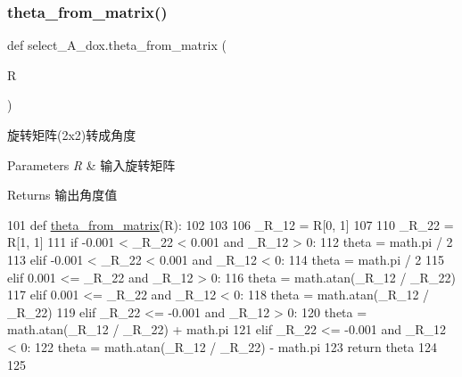 \subsubsection{\texorpdfstring{theta\+\_\+from\+\_\+matrix()}{theta\_from\_matrix()}}
{\footnotesize\ttfamily def select\+\_\+\+A\+\_\+dox.\+theta\+\_\+from\+\_\+matrix (\begin{DoxyParamCaption}\item[{}]{R }\end{DoxyParamCaption})}



旋转矩阵(2x2)转成角度 


\begin{DoxyParams}{Parameters}
{\em R} & 输入旋转矩阵\\
\hline
\end{DoxyParams}
\begin{DoxyReturn}{Returns}
输出角度值 
\end{DoxyReturn}

\begin{DoxyCode}
101 \textcolor{keyword}{def }\hyperlink{namespaceselect___a__dox_a7b416b405b394ffdf3fb7ca9d91bd896}{theta\_from\_matrix}(R):
102 
103     
106     \_R\_12 = R[0, 1]
107     
110     \_R\_22 = R[1, 1]
111     \textcolor{keywordflow}{if} -0.001 < \_R\_22 < 0.001 \textcolor{keywordflow}{and} \_R\_12 > 0:
112         theta = math.pi / 2
113     \textcolor{keywordflow}{elif} -0.001 < \_R\_22 < 0.001 \textcolor{keywordflow}{and} \_R\_12 < 0:
114         theta = math.pi / 2
115     \textcolor{keywordflow}{elif} 0.001 <= \_R\_22 \textcolor{keywordflow}{and} \_R\_12 > 0:
116         theta = math.atan(\_R\_12 / \_R\_22)
117     \textcolor{keywordflow}{elif} 0.001 <= \_R\_22 \textcolor{keywordflow}{and} \_R\_12 < 0:
118         theta = math.atan(\_R\_12 / \_R\_22)
119     \textcolor{keywordflow}{elif} \_R\_22 <= -0.001 \textcolor{keywordflow}{and} \_R\_12 > 0:
120         theta = math.atan(\_R\_12 / \_R\_22) + math.pi
121     \textcolor{keywordflow}{elif} \_R\_22 <= -0.001 \textcolor{keywordflow}{and} \_R\_12 < 0:
122         theta = math.atan(\_R\_12 / \_R\_22) - math.pi
123     \textcolor{keywordflow}{return} theta
124 
125 
\end{DoxyCode}
\mbox{\label{namespaceselect___a__dox_ac19f6260515ad57d2a375614405ec33d}} 
